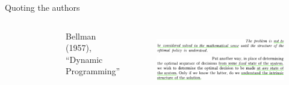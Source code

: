\documentclass[aspectratio=169]{beamer}
\begin{document}
\begin{frame}{Quoting the authors}
\begin{columns}
\begin{columns}
\begin{figure}
\includegraphics[width=\columnwidth]{figures/bellman.jpg}
\end{figure}
Bellman (1957), \\ ``Dynamic Programming''
\end{columns}
\begin{figure}[h]
\includegraphics[width=.9\columnwidth]{figures/bellman_quote_1.png} \\
\includegraphics[width=.9\columnwidth]{figures/bellman_quote_2.png} \\

\end{figure}
\end{columns}
\end{frame}
\end{document}
